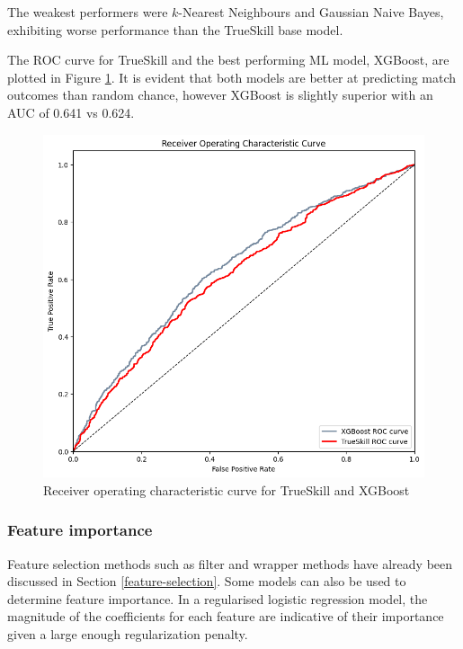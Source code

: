 The weakest performers were $k$-Nearest Neighbours and Gaussian Naive Bayes, exhibiting worse performance than the TrueSkill base model.

The ROC curve for TrueSkill and the best performing ML model, XGBoost, are plotted in Figure \ref{fig:xgb-roc}. It is evident that both models are better at predicting match outcomes than random chance, however XGBoost is slightly superior with an AUC of 0.641 vs 0.624.

\begin{figure}[h]
	\centering
	\begin{adjustbox}{center}
		\includegraphics[width=1.1\textwidth]{Figures/xgb-auc.png}
	\end{adjustbox}
	\caption{Receiver operating characteristic curve for TrueSkill and XGBoost}
	\label{fig:xgb-roc}
\end{figure}

\subsubsection{Feature importance}

Feature selection methods such as filter and wrapper methods have already been discussed in Section \ref{feature-selection}. Some models can also be used to determine feature importance. In a regularised logistic regression model, the magnitude of the coefficients for each feature are indicative of their importance given a large enough regularization penalty. 

